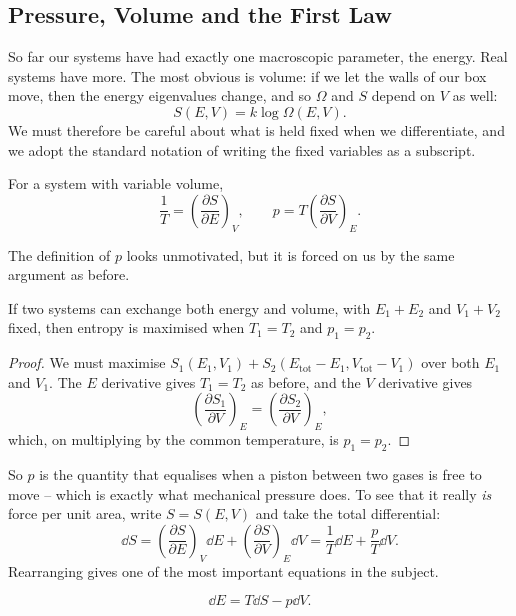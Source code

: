 \subsection{Pressure, Volume and the First Law}

So far our systems have had exactly one macroscopic parameter, the energy. Real systems have more. The most obvious is volume: if we let the walls of our box move, then the energy eigenvalues change, and so $\Omega$ and $S$ depend on $V$ as well:
$$
S(E,V) = k\log \Omega(E,V).
$$
We must therefore be careful about what is held fixed when we differentiate, and we adopt the standard notation of writing the fixed variables as a subscript.

\begin{definition}
	For a system with variable volume,
	$$
	\frac 1T = \left(\frac{\partial S}{\partial E}\right)_V, \qquad p = T\left(\frac{\partial S}{\partial V}\right)_E.
	$$
\end{definition}

The definition of $p$ looks unmotivated, but it is forced on us by the same argument as before.

\begin{proposition}
	If two systems can exchange both energy and volume, with $E_1 + E_2$ and $V_1 + V_2$ fixed, then entropy is maximised when $T_1 = T_2$ and $p_1 = p_2$.
\end{proposition}
\begin{proof}
	We must maximise $S_1(E_1, V_1) + S_2(E_{\mathrm{tot}} - E_1, V_{\mathrm{tot}} - V_1)$ over both $E_1$ and $V_1$. The $E$ derivative gives $T_1 = T_2$ as before, and the $V$ derivative gives
	$$
	\left(\frac{\partial S_1}{\partial V}\right)_E = \left(\frac{\partial S_2}{\partial V}\right)_E,
	$$
	which, on multiplying by the common temperature, is $p_1 = p_2$.
\end{proof}

So $p$ is the quantity that equalises when a piston between two gases is free to move -- which is exactly what mechanical pressure does. To see that it really \emph{is} force per unit area, write $S = S(E,V)$ and take the total differential:
$$
\dd S = \left(\frac{\partial S}{\partial E}\right)_V \dd E + \left(\frac{\partial S}{\partial V}\right)_E \dd V = \frac{1}{T}\dd E + \frac pT \dd V.
$$
Rearranging gives one of the most important equations in the subject.

\begin{proposition}
	$$
	\dd E = T \dd S - p \dd V.
	$$
\end{proposition}


